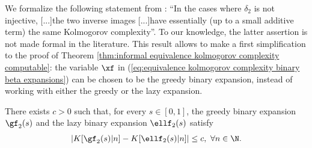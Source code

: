 We formalize the following statement from \cite[Section IV]{balcazar1997hierarchy}: ``In the cases where $\delta_2$ is not injective, [...]\hspace{0.5mm}the two inverse images [...]\hspace{0.5mm}have essentially (up to a small additive term) the same Kolmogorov complexity''. To our knowledge, the latter assertion is not made formal in the literature. This result allows to make a first simplification to the proof of Theorem \ref{thm:informal equivalence kolmogorov complexity computable}: the variable $\xf$ in (\ref{eq:equivalence kolmogorov complexity binary beta expansions}) can be chosen to be the greedy binary expansion, instead of working with either the greedy or the lazy expansion.
\begin{lemma}\label{lem:greedy and lazy expansion have same K complexity}
	There exists $c > 0$ such that, for every $s \in [0,1]$, the greedy binary expansion $\gf_2(s)$ and the lazy binary expansion $\ellf_2(s)$ satisfy 
\begin{equation}\label{eq:greedy and lazy binary expansions have same algorithmic complexity}
	\left|K[\gf_2(s)|n] - K[\ellf_2(s)|n]\right| \leq c, \ \forall n \in \N.
\end{equation}
\end{lemma}

